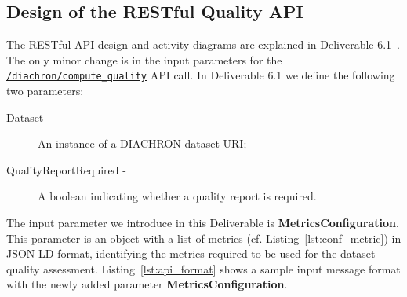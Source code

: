 
\subsection{Design of the RESTful Quality API}
\label{sec:RestAPI} 
The RESTful API design and activity diagrams are explained in Deliverable 6.1~\cite[Section 6.1.7]{diachron-d6.1}.
The only minor change is in the input parameters for the \texttt{\url{/diachron/compute_quality}} API call.
In Deliverable 6.1 we define the following two parameters:
\begin{description}
\item[Dataset -] An instance of a DIACHRON dataset URI;
\item[QualityReportRequired -] A boolean indicating whether a quality report is required.
\end{description}
The input parameter we introduce in this Deliverable is \textbf{MetricsConfiguration}.
This parameter is an object with a list of metrics (cf. Listing~\ref{lst:conf_metric}) in JSON-LD format, identifying the metrics required to be used for the dataset quality assessment.
Listing~\ref{lst:api_format} shows a sample input message format with the newly added parameter \textbf{MetricsConfiguration}.
 
